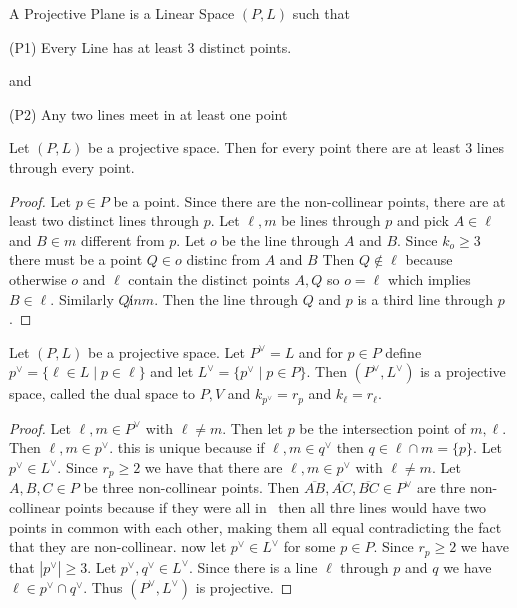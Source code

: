 \begin{Def}
A Projective Plane is a Linear Space 
\((P,L)\) such that 
\begin{Axiom}(P1)
    Every Line has at least 3 distinct points.
\end{Axiom}
and 
\begin{Axiom}(P2)
    Any two lines meet in at least one point
\end{Axiom}
\end{Def}
\begin{Lemma}
Let \((P,L)\) be a projective space. Then for every point there are at least 3 lines through 
every point.
\end{Lemma}
\begin{proof}
Let \(p\in P\) be a point.
Since there are the non-collinear points, there are at least two distinct lines 
through \(p\). Let \(\ell,m\) be lines through \(p\) and pick \(A\in \ell\) and \(B\in m\) different 
from \(p\). Let \(o\) be the line through \(A\) and \(B\). Since 
\(k_o\geq 3\) there must be a point \(Q\in o\) distinc from \(A\) and \(B\)
Then \(Q\not \in \ell\) because otherwise \(o\) and \(\ell\) contain the distinct 
points \(A,Q\) so \(o=\ell\) which implies \(B\in \ell\).
Similarly \(Q\not in m\).
Then the line through \(Q\) and \(p\) is a third line through \(p\).


\end{proof}
\begin{Def}
Let \((P,L)\) be a projective space. Let \(P^\vee=L\) and 
for \(p\in P\) define \(p^\vee=\{\ell\in L\mid p\in \ell\}\) and let 
\(L^\vee=\{p^\vee\mid p\in P\}\).
Then \((P^\vee,L^\vee)\) is a projective space, called the dual space to \(P,V\) and 
\(k_{p^\vee}=r_p\) and \(k_\ell=r_\ell\).
\end{Def}
\begin{proof}
Let \(\ell,m\in P^\vee\) with \(\ell\neq m\). Then let \(p\) be the intersection point 
of \(m,\ell\). Then \(\ell,m\in p^\vee\). this is unique because if \(\ell,m\in q^\vee\) then
\(q\in \ell\cap m=\{p\}\).
Let \(p^\vee\in L^\vee\). Since \(r_p\geq 2\) we have that there are \(\ell,m\in p^\vee\) with \(\ell\neq m\).
Let \(A,B,C\in P\) be three non-collinear points.
Then \(\overline{AB},\overline{AC},\overline{BC}\in P^\vee\) are thre non-collinear points because 
if they were all in \
then all thre lines would have two points in common with each other, making them all equal contradicting
the fact that they are non-collinear.
now let \(p^\vee\in L^\vee\) for some \(p\in P\). Since 
\(r_p\geq 2\) we have that \(|p^\vee|\geq 3\).
Let \(p^\vee,q^\vee\in L^\vee\).
Since there is a line \(\ell\) through \(p\) and \(q\) we have \(\ell\in p^\vee\cap q^\vee\).
Thus \((P^\vee,L^\vee)\) is projective.

\end{proof}
